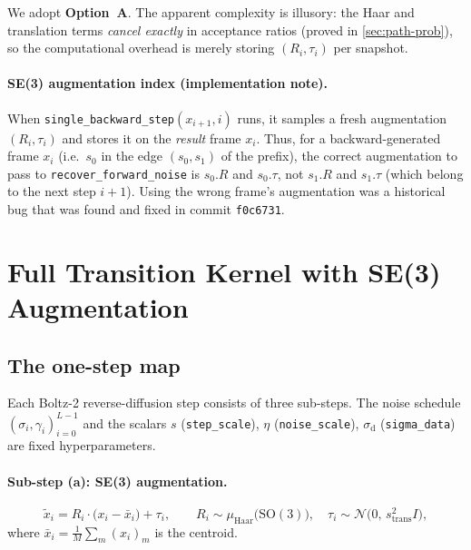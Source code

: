 \documentclass[11pt,a4paper]{article}
\newcommand{\N}{\mathcal{N}}
\newcommand{\Haar}{\mu_{\mathrm{Haar}}}
\newcommand{\xtilde}{\tilde{x}}
\newcommand{\sigmaD}{\sigma_{\mathrm{d}}}
\begin{document}
We adopt \textbf{Option~A}.  The apparent complexity is illusory: the
Haar and translation terms \emph{cancel exactly} in acceptance ratios
(proved in \cref{sec:path-prob}), so the computational overhead is
merely storing $(R_i, \tau_i)$ per snapshot.

\paragraph{SE(3) augmentation index (implementation note).}
When \texttt{single\_backward\_step}$(x_{i+1}, i)$ runs, it samples a
fresh augmentation $(R_i, \tau_i)$ and stores it on the \emph{result}
frame $x_i$.  Thus, for a backward-generated frame $x_i$ (i.e.\ $s_0$
in the edge $(s_0, s_1)$ of the prefix), the correct augmentation to
pass to \texttt{recover\_forward\_noise} is $s_0.R$ and $s_0.\tau$, not
$s_1.R$ and $s_1.\tau$ (which belong to the next step $i+1$).  Using
the wrong frame's augmentation was a historical bug that was found and
fixed in commit \texttt{f0c6731}.

\section{Full Transition Kernel with SE(3) Augmentation}
\label{sec:kernel}

\subsection{The one-step map}

Each Boltz-2 reverse-diffusion step consists of three sub-steps.
The noise schedule $(\sigma_i, \gamma_i)_{i=0}^{L-1}$ and the scalars
$s$ (\texttt{step\_scale}), $\eta$ (\texttt{noise\_scale}),
$\sigmaD$ (\texttt{sigma\_data}) are fixed hyperparameters.

\paragraph{Sub-step (a): SE(3) augmentation.}
\begin{equation}
  \xtilde_i = R_i \cdot \bigl(x_i - \bar x_i\bigr) + \tau_i,
  \qquad
  R_i \sim \Haar\bigl(\mathrm{SO}(3)\bigr),\quad
  \tau_i \sim \N\bigl(0,\, s_{\mathrm{trans}}^2 I\bigr),
  \label{eq:se3-aug}
\end{equation}
where $\bar x_i = \frac{1}{M}\sum_m (x_i)_m$ is the centroid.
\end{document}
